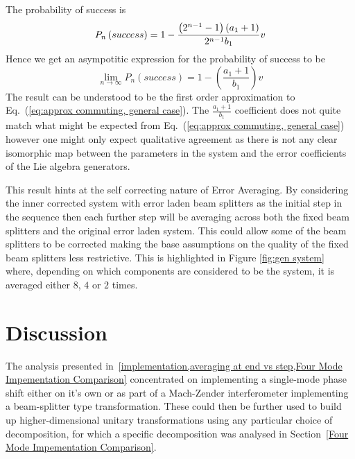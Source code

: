 \documentclass[aps,pra,twocolumn,superscriptaddress,numerical,floatfix]{revtex4-1}
\begin{document}
The probability of success is 
\begin{equation}
P_{n}\left(success\right) =  1-\frac{\left(2^{n-1}-1\right)\left(a_{1}+1\right)}{2^{n-1}b_{1}}v\nonumber \\
\end{equation}
Hence we get an asympotitic expression for the probability of success to be 
\begin{equation}
\lim_{n\rightarrow\infty}P_{n}\left(success\right)=1-\left(\frac{a_{1}+1}{b_{1}}\right)v\label{eq:PsuccessGeneral}
\end{equation}
The result can be understood to be the first order approximation to Eq.~(\ref{eq:approx commuting, general case}). The $\frac{a_1+1}{b_1}$ coefficient does not quite match what might be expected from Eq.~(\ref{eq:approx commuting, general case}) however one might only expect qualitative agreement as there is not any clear isomorphic map between the parameters in the system and the error coefficients of the Lie algebra generators.

This result hints at the self correcting nature of Error Averaging. By considering the inner corrected system with error laden beam splitters as the initial step in the sequence then each further step will be averaging across both the fixed beam splitters and the original error laden system. This could allow some of the beam splitters to be corrected  making the base assumptions on the quality of the fixed beam splitters less restrictive. This is highlighted in Figure \ref{fig:gen system} where, depending on which components are considered to be the system, it is averaged either $8$, $4$ or $2$ times. 

\section{Discussion\label{Discussion}}

The analysis presented in~\cref{implementation,averaging at end vs step,Four Mode Impementation Comparison} concentrated on implementing a single-mode phase shift either on it's own or as part of a Mach-Zender interferometer implementing a beam-splitter type transformation.  These could then be further used to build up higher-dimensional unitary transformations using any particular choice of decomposition, for which a specific decomposition was analysed in Section~\ref{Four Mode Impementation Comparison}.
\end{document}
